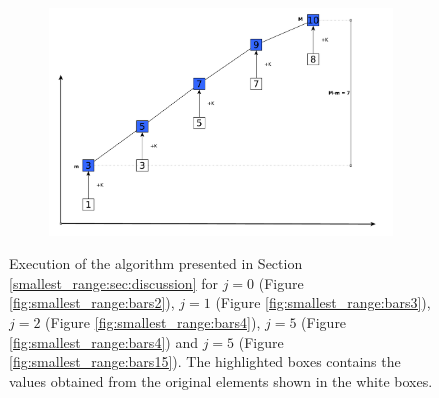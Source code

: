 \begin{figure}\ContinuedFloat
	\begin{subfigure}{0.99\textwidth}
		\centering
		\includegraphics[width=1\linewidth]{sources/smallest_range/images/bars6}
		\label{fig:smallest_range:bars6}
	\end{subfigure}

	\caption{Execution of the algorithm presented in Section \ref{smallest_range:sec:discussion}
	for $j=0$ (Figure \ref{fig:smallest_range:bars2}),  $j=1$ (Figure \ref{fig:smallest_range:bars3}),
	$j=2$ (Figure \ref{fig:smallest_range:bars4}), $j=5$ (Figure \ref{fig:smallest_range:bars4}) 
	and $j=5$ (Figure \ref{fig:smallest_range:bars15}).
	The highlighted boxes contains the values obtained from the original elements
	shown in the white boxes.}
	\label{fig:smallest_range:bars_execution}
\end{figure}